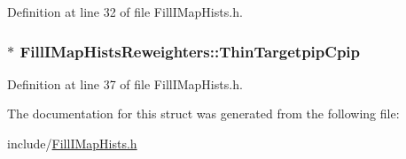 Definition at line 32 of file Fill\-I\-Map\-Hists.\-h.

\hypertarget{struct_fill_i_map_hists_reweighters_a53fad838dba1cadd89a081a60022e902}{
\subsubsection[{Thin\-Targetpip\-Cpip}]{$\ast$ Fill\-I\-Map\-Hists\-Reweighters\-::\-Thin\-Targetpip\-Cpip}}\label{struct_fill_i_map_hists_reweighters_a53fad838dba1cadd89a081a60022e902}


Definition at line 37 of file Fill\-I\-Map\-Hists.\-h.



The documentation for this struct was generated from the following file\-:\begin{DoxyCompactItemize}
\item 
include/\hyperlink{_fill_i_map_hists_8h}{Fill\-I\-Map\-Hists.\-h}\end{DoxyCompactItemize}
